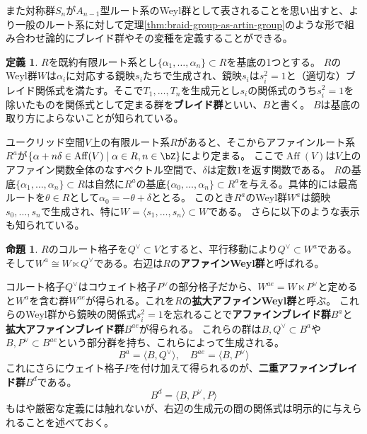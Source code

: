 \documentclass[uplatex,11pt,a4paper,dvipdfmx]{jsarticle}
\numberwithin{equation}{section}
\theoremstyle{definition}
\newtheorem{proposition}[theorem]{命題}
\newtheorem{definition}[theorem]{定義}
\DeclareMathOperator{\Aff}{Aff}
\begin{document}
また対称群$S_n$が$A_{n-1}$型ルート系のWeyl群として表されることを思い出すと、より一般のルート系に対して定理\ref{thm:braid-group-as-artin-group}のような形で組み合わせ論的にブレイド群やその変種を定義することができる。
\begin{definition}
    $R$を既約有限ルート系とし$\{\alpha_1, \dots, \alpha_n\} \subset R$を基底の1つとする。
    $R$のWeyl群$W$は$\alpha_i$に対応する鏡映$s_i$たちで生成され、鏡映$s_i$は$s_i^2=1$と（適切な）ブレイド関係式を満たす。そこで$T_1, \dots, T_n$を生成元とし$s_i$の関係式のうち$s_i^2=1$を除いたものを関係式として定まる群を\textbf{ブレイド群}といい、$B$と書く。
    $B$は基底の取り方によらないことが知られている。
\end{definition}
ユークリッド空間$V$上の有限ルート系$R$があると、そこからアファインルート系$R^{a}$が$\{\alpha + n \delta \in \Aff(V) \mid \alpha \in R, n \in \bZ\}$により定まる。
ここで$\Aff(V)$は$V$上のアファイン関数全体のなすベクトル空間で、$\delta$は定数$1$を返す関数である。
$R$の基底$\{\alpha_1, \dots, \alpha_n\} \subset R$は自然に$R^{a}$の基底$\{\alpha_0, \dots, \alpha_n\} \subset R^{a}$を与える。具体的には最高ルートを$\theta \in R$として$\alpha_0 = -\theta + \delta$ととる。
このとき$R^{a}$のWeyl群$W^{a}$は鏡映$s_0, \dots, s_n$で生成され、特に$W = \langle s_1, \dots, s_n\rangle \subset W$である。
さらに以下のような表示も知られている。
\begin{proposition}
    $R$のコルート格子を$Q^\vee \subset V$とすると、平行移動により$Q^\vee \subset W^{a}$である。そして$W^{a} \cong W \ltimes Q^\vee$である。右辺は$R$の\textbf{アファインWeyl群}と呼ばれる。
\end{proposition}
コルート格子$Q^\vee$はコウェイト格子$P^\vee$の部分格子だから、$W^{ae} = W \ltimes P^\vee$と定めると$W^{a}$を含む群$W^{ae}$が得られる。これを$R$の\textbf{拡大アファインWeyl群}と呼ぶ。
これらのWeyl群から鏡映の関係式$s_i^2 = 1$を忘れることで\textbf{アファインブレイド群}$B^{a}$と\textbf{拡大アファインブレイド群}$B^{ae}$が得られる。
これらの群は$B, Q^\vee \subset B^{a}$や$B, P^\vee \subset B^{ae}$という部分群を持ち、これらによって生成される。
\begin{equation}
    B^{a} = \langle B, Q^\vee \rangle, \quad B^{ae} = \langle B, P^\vee \rangle
\end{equation}
これにさらにウェイト格子$P$を付け加えて得られるのが、\textbf{二重アファインブレイド群}$B^{d}$である。
\begin{equation}
    B^{d} = \langle B, P^\vee, P\rangle
\end{equation}
もはや厳密な定義には触れないが、右辺の生成元の間の関係式は明示的に与えられることを述べておく。
\end{document}
